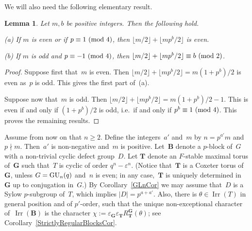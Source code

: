 \documentclass[12pt]{amsart}
\newcommand{\bG}{{\mathbf{G}}}      %
\newcommand{\bB}{{\mathbf{B}}}
\newcommand{\bT}{{\mathbf{T}}}
\def\GU{ \text{\rm GU} }
\DeclareMathOperator{\Irr}{Irr}
\newtheorem{lem}[thm]{Lemma}
\theoremstyle{theorem}
\theoremstyle{definition}
\theoremstyle{remark}
\begin{document}
We will also need the following elementary result.

\begin{lem}
\label{CongruenceOfFloors}
Let $m, b$ be positive integers. Then the following hold.

{\rm (a)} If $m$ is even or if $p \equiv 1\,\,(\mbox{\rm mod}\,\,4)$,
then $\lfloor m/2 \rfloor + \lfloor mp^b/2 \rfloor$ is even.

{\rm (b)} If $m$ is odd and $p \equiv -1\,\,(\mbox{\rm mod}\,\,4)$,
then $\lfloor m/2 \rfloor + \lfloor mp^b/2 \rfloor 
\equiv b\,\,(\mbox{\rm mod}\,\,2)$.
\end{lem}
\begin{proof}
Suppose first that~$m$ is even. Then
$\lfloor m/2 \rfloor + \lfloor mp^b/2 \rfloor = m(1+p^b)/2$ is
even as~$p$ is odd. This gives the first part of~(a).

Suppose now that~$m$ is odd. Then
$\lfloor m/2 \rfloor + \lfloor mp^b/2 \rfloor = m(1+p^b)/2 - 1$. This
is even if and only if $(1+p^b)/2$ is odd, i.e.\ if and only if
$p^b\equiv 1\,\,(\mbox{\rm mod}\,\,4)$. This proves the remaining results.
\end{proof}

Assume from now on that $n \geq 2$.
Define the integers~$a'$ and~$m$ by $n = p^{a'}m$ and $p \nmid m$.
Then~$a'$ is non-negative and~$m$ is positive.
Let~${\bB}$ denote a $p$-block of~${G}$ with a non-trivial cyclic 
defect group~${D}$. Let ${\bT}$ denote an $F$-stable maximal torus 
of~${\bG}$ such that~${T}$ is cyclic of order $q^n - \varepsilon^n$. 
(Notice that~${\bT}$ is a Coxeter torus of~${\bG}$, unless 
${G} = \GU_n(q)$ and~$n$ is even; in any case,~${\bT}$ is uniquely 
determined in~${\bG}$ up to conjugation in~${G}$.) 
By Corollary~\ref{GLnCor} we may assume that~${D}$ is a Sylow 
$p$-subgroup of~${T}$, which implies $|{D}| = p^{a+a'}$. Also, there is 
$\theta \in \Irr( {T} )$ in general position and of $p'$-order, such that 
the unique non-exceptional character of~$\Irr({\bB})$ is the character 
${\chi} :=
\varepsilon_{{\bG}}\varepsilon_{{\bT}}R_{{\bT}}^{{\bG}}( \theta )$;
see Corollary~\ref{StrictlyRegularBlocksCor}.
\end{document}
